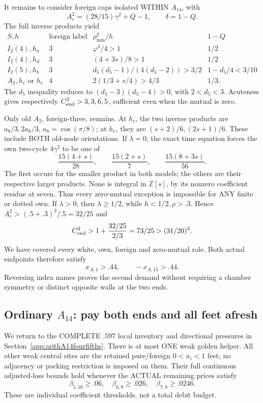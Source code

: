 \documentclass[11pt]{article}
\begin{document}
It remains to consider foreign caps isolated
WITHIN \(A_{14}\), with
\[
                 A_c^2=(28/15)\gamma^2+Q-1,\qquad \delta=1-Q .
\]
The full inverse products yield
\[
 \begin{array}{c|c|c|c}
 S,h&\text{foreign label}&\rho_{\min}^2/h&1-Q\\ \hline
 I_2(4),h_a&3&\varphi^3/4>1&1/2\\
 I_2(4),h_d&3&(4+3s)/8>1&1/2\\
 I_2(5),h_b&3&d_5(d_5-1)/(4(d_5-2))>3/2&1-d_5/4<3/10\\
 A_2,h_c\text{ or }h_e&4&2(1/3+s/4)>4/3&1/3 .
 \end{array}
\]
The \(d_5\) inequality reduces to
\((d_5-3)(d_5-4)>0\), with \(2<d_5<3\).
Acuteness gives respectively
\(C_{\rm end}^2>3,3,6,5\), sufficient
even when the mutual is zero.

Only old \(A_2\), foreign-three, remains.
At \(h_c\), the two inverse products are
\(a_8/3,2a_8/3\), \(a_8=\cos(\pi/8)\);
at \(h_e\), they are
\((s+2)/6,(2s+1)/6\).
These include BOTH old-node orientations.
If \(\lambda=0\), the exact time equation
forces the own two-cycle \(4\gamma^2\)
to be one of
\[
                  {\frac{15(4+s)}{28}},\qquad
                  {\frac{15(2+s)}{7}},\qquad
                  {\frac{15(8+3s)}{56}}.
\]
The first occurs for the smaller product
in both models; the others are their
respective larger products.
None is integral in \(\mathbb Z[s]\),
by its nonzero coefficient residue at seven.
Thus every zero-mutual exception is impossible
for ANY finite or dotted own.
If \(\lambda>0\), then \(\lambda\ge1/2\),
while \(h<1/2,\rho>.3\).
Hence \(A_c^2>(.5+.3)^2/.5=32/25\) and
\[
                    C_{\rm end}^2>
                      1+{\frac{32/25}{2/3}}=73/25>(31/20)^2 .
\]
We have covered every white, own, foreign
and zero-mutual role.
Both actual endpoints therefore satisfy
\[
                     x_{A,1}>.44,\qquad -x_{A,15}>.44 .
\tag{A14ordends}\label{eq:arithA14ordinaryendpoint}
\]
Reversing index names proves the second
demand without requiring a chamber symmetry
or distinct opposite walls at the two ends.

\subsection[Ordinary A14: pay both ends and all feet afresh]{Ordinary \(A_{14}\): pay both ends and all feet afresh}
\label{app:arithA14ordinarycomposition}

We return to the COMPLETE \(.597\) local
inventory and directional pressures in
Section~\ref{app:arithA14fourfifths}.
There is at most ONE weak golden helper.
All other weak central sites are the
retained pure/foreign \(0<u_i<1\) feet;
no adjacency or packing restriction is
imposed on them.
Their full continuous adjusted-loss bounds
hold whenever the ACTUAL remaining prices
satisfy
\[
             \beta_{5,10}\ge.06,\quad
             \beta_{6,9}\ge.026,\quad
             \beta_{7,8}\ge.0246 .
\]
These are individual coefficient thresholds,
not a total debit budget.
\end{document}
